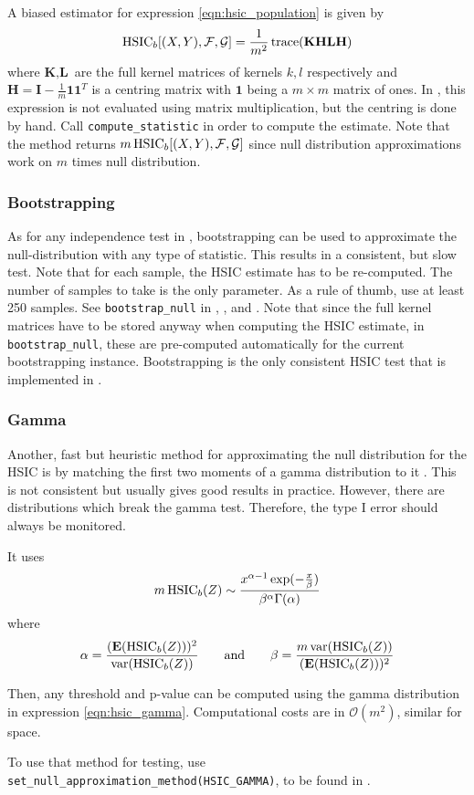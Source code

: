 A biased estimator for expression \ref{eqn:hsic_population} is given by
\begin{align*}
\operatorname{HSIC}_b[(X,Y),\mathcal{F},\mathcal{G}]=\frac{1}{m^2}\operatorname{trace}(\textbf{KHLH})
\end{align*}
where $\textbf{K}, \textbf{L}$ are the full kernel matrices of kernels $k, l$ respectively and $\textbf{H}=\textbf{I}-\frac{1}{m}\textbf{1}\textbf{1}^T$ is a centring matrix with $\textbf{1}$ being a $m\times m$ matrix of ones. In \shogun{}, this expression is not evaluated using matrix multiplication, but the centring is done by hand. Call \texttt{compute\_statistic} in order to compute the estimate. Note that the method returns $m\operatorname{HSIC}_b[(X,Y),\mathcal{F},\mathcal{G}]$ since null distribution approximations work on $m$ times null distribution.

\subsubsection{Bootstrapping}
As for any independence test in \shogun{}, bootstrapping can be used to approximate the null-distribution with any type of statistic. This results in a consistent, but slow test. Note that for each sample, the HSIC estimate has to be re-computed. The number of samples to take is the only parameter. As a rule of thumb, use at least 250 samples.
See \texttt{bootstrap\_null} in , , and . Note that since the full kernel matrices have to be stored anyway when computing the HSIC estimate, in \texttt{bootstrap\_null}, these are pre-computed automatically for the current bootstrapping instance.
Bootstrapping is the only consistent HSIC test that is implemented in \shogun{}.

\subsubsection{Gamma}
Another, fast but heuristic method for approximating the null distribution for the HSIC is by matching the first two moments of a gamma distribution to it \citep[Equation 9]{Gretton2008d}. This is not consistent but usually gives good results in practice. However, there are distributions which break the gamma test. Therefore, the type I error should always be monitored.

It uses
\begin{align}
\label{eqn:hsic_gamma}
m\operatorname{HSIC}_b(Z) \sim \frac{x^{\alpha-1}\exp(-\frac{x}{\beta})}{\beta^\alpha \Gamma(\alpha)}
\end{align}
where
\begin{align*}
\alpha=\frac{(\textbf{E}(\operatorname{HSIC}_b(Z)))^2}{\operatorname{var}(\operatorname{HSIC}_b(Z))} \qquad \text{and} \qquad
 \beta=\frac{m \operatorname{var}(\operatorname{HSIC}_b(Z))}{(\textbf{E}(\operatorname{HSIC}_b(Z)))^2}
\end{align*}

Then, any threshold and p-value can be computed using the gamma distribution in expression \ref{eqn:hsic_gamma}. Computational costs are in $\mathcal{O}(m^2)$, similar for space.

To use that method for testing, use \texttt{set\_null\_approximation\_method(HSIC\_GAMMA)}, to be found in .